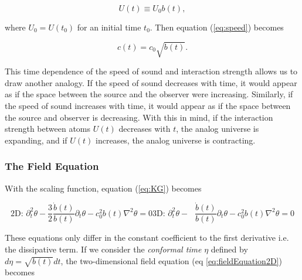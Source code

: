 \documentclass{article}
\begin{document}
            \begin{equation}
                U(t) \equiv U_0 b(t),
            \end{equation}

            where $U_0 = U(t_0)$ for an initial time $t_0$.  Then equation (\ref{eq:speed}) becomes 

            \begin{equation}
                c(t) = c_0 \sqrt{b(t)}.
            \end{equation}

            This time dependence of the speed of sound and interaction strength allows us to draw another analogy.  If the speed of sound decreases with time, it would appear as if the space between the source and the observer were increasing.  Similarly, if the speed of sound increases with time, it would appear as if the space between the source and observer is decreasing. With this in mind, if the interaction strength between atoms $U(t)$ decreases with $t$, the analog universe is expanding, and if $U(t)$ increases, the analog universe is contracting.

        \subsubsection{The Field Equation}

            With the scaling function, equation (\ref{eq:KG}) becomes

            \begin{subequations}
            \begin{equation} \label{eq:fieldEquation2D}
                \text{2D: } \partial_t^2\theta - \frac{3}{2} \frac{\dot{b}(t)}{b(t)} \partial_t \theta - c_0^2 b(t) \nabla^2\theta = 0
            \end{equation}
            \begin{equation} \label{eq:fieldEquation3D}
                \text{3D: } \partial_t^2\theta - \phantom{\frac{3}{2}} \frac{\dot{b}(t)}{b(t)} \partial_t \theta - c_0^2 b(t) \nabla^2\theta = 0
            \end{equation}
            \end{subequations}

            These equations only differ in the constant coefficient to the first derivative i.e. the dissipative term.  If we consider the \emph{conformal time} $\eta$ defined by $d\eta = \sqrt{b(t)} dt$, the two-dimensional field equation (eq \ref{eq:fieldEquation2D}) becomes
\end{document}
